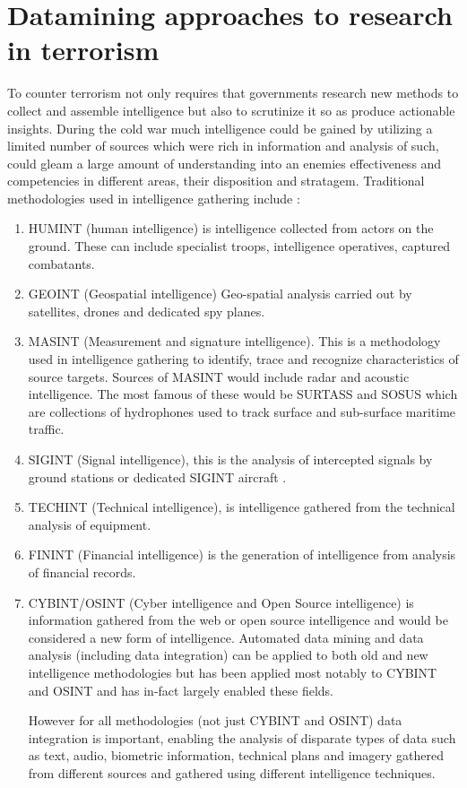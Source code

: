 \chapter[Datamining and statistical approaches to research in terrorism and counter terrorism]{Datamining approaches to research in terrorism}

To counter terrorism not only requires that governments research new methods to collect and assemble intelligence but also to scrutinize it so as produce actionable insights. During the cold war much intelligence could be gained by utilizing a limited number of sources which were rich in information and analysis of such, could gleam a large amount of understanding into an enemies effectiveness and competencies in different areas, their disposition and stratagem. Traditional methodologies used in intelligence gathering include \citep{tanner2014examining}:
\begin{enumerate}
\item HUMINT (human intelligence) is intelligence collected from actors on the ground. These can include specialist troops, intelligence operatives, captured combatants.
\item GEOINT (Geospatial intelligence) Geo-spatial analysis carried out by satellites, drones and dedicated spy planes.
\item MASINT (Measurement and signature intelligence). This is a methodology  used in intelligence gathering to identify, trace and recognize characteristics of source targets. Sources of MASINT would include radar and acoustic intelligence. The most famous of these would be SURTASS and SOSUS \citep{noles2003judge} which are collections of hydrophones used to track surface and sub-surface maritime traffic.
\item SIGINT (Signal intelligence), this is the analysis of intercepted signals by ground stations or dedicated SIGINT aircraft \citep{aid2003all}.
\item TECHINT (Technical intelligence), is intelligence gathered from the technical analysis of equipment.
\item FININT  (Financial intelligence) is the generation of intelligence from analysis of financial records.
\item CYBINT/OSINT (Cyber intelligence and Open Source intelligence) \citep{csahinnew} is information gathered from the web or open source intelligence and would be considered a new form of intelligence. Automated data mining and data analysis (including data integration) can be applied to both old and new intelligence methodologies but has been applied most notably to CYBINT and OSINT and has in-fact largely enabled these fields.

However for all methodologies (not just CYBINT and OSINT) data integration is important, enabling the analysis of disparate types of data such as text, audio, biometric information, technical plans and imagery gathered from different sources and gathered using different intelligence techniques.
\end{enumerate}


